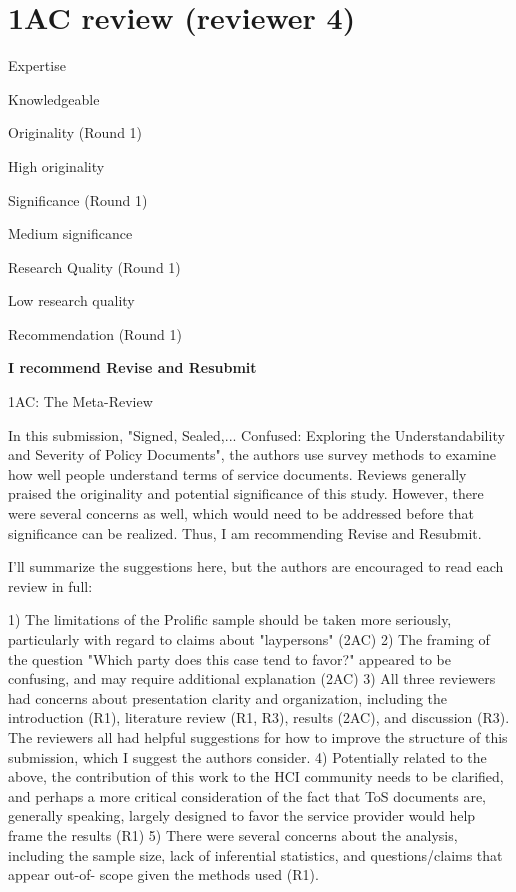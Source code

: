 \section*{1AC review (reviewer 4)}

Expertise

Knowledgeable

Originality (Round 1)

High originality

Significance (Round 1)

Medium significance

Research Quality (Round 1)

Low research quality

Recommendation (Round 1)

\textbf{I recommend Revise and Resubmit}

1AC: The Meta-Review

In this submission, "Signed, Sealed,... Confused: Exploring the Understandability
and Severity of Policy Documents", the authors use survey methods to
examine how well people understand terms of service documents. Reviews
generally praised the originality and potential significance of this
study. However, there were several concerns as well, which would need
to be addressed before that significance can be realized. Thus, I am
recommending Revise and Resubmit.

I'll summarize the suggestions here, but the authors are encouraged to read each
review in full:

1) The limitations of the Prolific sample should be taken more seriously,
particularly with regard to claims about "laypersons" (2AC)
2) The framing of the question "Which party does this case tend to favor?"
appeared to be confusing, and may require additional explanation (2AC)
3) All three reviewers had concerns about presentation clarity and organization,
including the introduction (R1), literature review (R1, R3), results
(2AC), and discussion (R3). The reviewers all had helpful suggestions
for how to improve the structure of this submission, which I suggest
the authors consider.
4) Potentially related to the above, the contribution of this work to the HCI
community needs to be clarified, and perhaps a more critical
consideration of the fact that ToS documents are, generally speaking,
largely designed to favor the service provider would help frame the
results (R1)
5) There were several concerns about the analysis, including the sample size, lack
of inferential statistics, and questions/claims that appear out-of-
scope given the methods used (R1).

